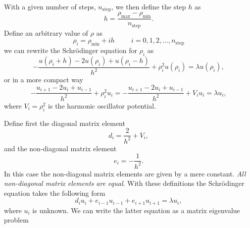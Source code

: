 With a given number of steps, $n_{\mathrm{step}}$, we then 
define the step $h$ as
\[
  h=\frac{\rho_{\mathrm{max}}-\rho_{\mathrm{min}} }{n_{\mathrm{step}}}.
\]
Define an arbitrary value of $\rho$ as 
\[
    \rho_i= \rho_{\mathrm{min}} + ih \hspace{1cm} i=0,1,2,\dots , n_{\mathrm{step}}
\]
we can rewrite the Schr\"odinger equation for $\rho_i$ as
\[
-\frac{u(\rho_i+h) -2u(\rho_i) +u(\rho_i-h)}{h^2}+\rho_i^2u(\rho_i)  = \lambda u(\rho_i),
\]
or in  a more compact way
\[
-\frac{u_{i+1} -2u_i +u_{i-1}}{h^2}+\rho_i^2u_i=-\frac{u_{i+1} -2u_i +u_{i-1} }{h^2}+V_iu_i  = \lambda u_i,
\]
where $V_i=\rho_i^2$ is the harmonic oscillator potential.




Define first the diagonal matrix element
\[
   d_i=\frac{2}{h^2}+V_i,
\]
and the non-diagonal matrix element 
\[
   e_i=-\frac{1}{h^2}.
\]
In this case the non-diagonal matrix elements are given by a mere constant.
{\em All non-diagonal matrix elements are equal}.
With these definitions the Schr\"odinger equation takes the following form
\[
d_iu_i+e_{i-1}u_{i-1}+e_{i+1}u_{i+1}  = \lambda u_i,
\]
where $u_i$ is unknown. We can write the 
latter equation as a matrix eigenvalue problem 
